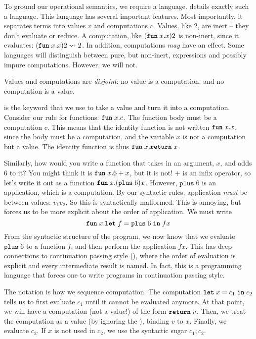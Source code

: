 To ground our operational semantics, we require a language.  details exactly such a language. This language has several important features. Most importantly, it separates terms into values $v$ and computations $c$. Values, like $2$, are inert -- they don't evaluate or reduce. A computation, like $(\textbf{\texttt{fun}} \; x. x) 2$ is non-inert, since it evaluates: $(\textbf{\texttt{fun}} \; x. x) 2 \leadsto 2$. In addition, computations \textit{may} have an effect. Some languages will distinguish between pure, but non-inert, expressions and possibly impure computations. However, we will not. 

Values and computations are \textit{disjoint}: no value is a computation, and no computation is a value.

 is the keyword that we use to take a value and turn it into a computation. Consider our rule for functions: $\textbf{\texttt{fun}} \; x. c$. The function body must be a computation $c$. This means that the identity function is not written $\textbf{\texttt{fun}} \; x. x$, since the body must be a computation, and the variable $x$ is not a computation but a value. The identity function is thus $\textbf{\texttt{fun}} \; x. \textbf{\texttt{return}} \; x$. 

Similarly, how would you write a function that takes in an argument, $x$, and adds $6$ to it? You might think it is $\textbf{\texttt{fun}} \; x. 6 + x$, but it is not! $+$ is an infix operator, so let's write it out as a function $\textbf{\texttt{fun}} \; x. (\texttt{plus} \; 6) x$. However, $\texttt{plus} \; 6$ is an application, which is a computation. By our syntactic rules, application \textit{must} be between values: $v_1 v_2$. So this is syntactically malformed. This is annoying, but forces us to be more explicit about the order of application. We must write
\[\textbf{\texttt{fun}} \; x. \textbf{\texttt{let}} \; f = \texttt{plus} \; 6 \; \textbf{\texttt{in}} \; f x\]
From the syntactic structure of the program, we now know that we evaluate $\texttt{plus} \; 6$ to a function $f$, and then perform the application $f x$. This has deep connections to continuation passing style (), where the order of evaluation is explicit and every intermediate result is named. In fact, this is a programming language that forces one to write programs in continuation passing style. 

The  notation is how we sequence computation. The computation $\textbf{\texttt{let}} \; x = c_1 \; \textbf{\texttt{in}} \; c_2$ tells us to first evaluate $c_1$ until it cannot be evaluated anymore. At that point, we will have a computation (not a value!) of the form $\textbf{\texttt{return}} \; v$. Then, we treat the computation as a value (by ignoring the ), binding $v$ to $x$. Finally, we evaluate $c_2$. If $x$ is not used in $c_2$, we use the syntactic sugar $c_1;c_2$.

